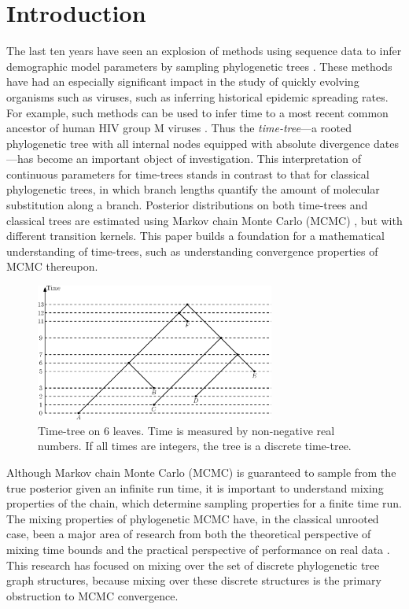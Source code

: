 \documentclass[11pt]{amsart}
\theoremstyle{definition}
\begin{document}
\section{Introduction}
The last ten years have seen an explosion of methods using sequence data to infer demographic model parameters by sampling phylogenetic trees \autocite{Kuhner1995-mj,Kuhner1998-tq,Kuhner2000-af,Beerli2001-sc,Kuhner2006-vx,Drummond2002,Drummond2005-ks,Drummond2006-oa,Minin2008-wz}.
These methods have had an especially significant impact in the study of quickly evolving organisms such as viruses, such as inferring historical epidemic spreading rates.
For example, such methods can be used to infer time to a most recent common ancestor of human HIV group M viruses \autocite{Worobey2008-rt,Baele2013-op}.
Thus the \emph{time-tree}---a rooted phylogenetic tree with all internal nodes equipped with absolute divergence dates---has become an important object of investigation.
This interpretation of continuous parameters for time-trees stands in contrast to that for classical phylogenetic trees, in which branch lengths quantify the amount of molecular substitution along a branch.
Posterior distributions on both time-trees and classical trees are estimated using Markov chain Monte Carlo (MCMC) \autocite{Mau1997-sq,Yang1997-gv,Drummond2002}, but with different transition kernels.
This paper builds a foundation for a mathematical understanding of time-trees, such as understanding convergence properties of MCMC thereupon.

\begin{figure}[ht]
\centering
\includegraphics[width=0.7\textwidth]{timeTree.eps}
\caption{Time-tree on $6$ leaves.
Time is measured by non-negative real numbers.
If all times are integers, the tree is a discrete time-tree.}
\label{timeTree.eps}
\end{figure}

Although Markov chain Monte Carlo (MCMC) is guaranteed to sample from the true posterior given an infinite run time, it is important to understand mixing properties of the chain, which determine sampling properties for a finite time run.
The mixing properties of phylogenetic MCMC have, in the classical unrooted case, been a major area of research from both the theoretical perspective of mixing time bounds \autocite{Mossel2005-ly,Mossel2006-fo,Stefankovic2011-hu,spade2014note} and the practical perspective of performance on real data \autocite{beiko2006searching,Ronquist2006-fv,lakner2008efficiency,Whidden2015-yi}.
This research has focused on mixing over the set of discrete phylogenetic tree graph structures, because mixing over these discrete structures is the primary obstruction to MCMC convergence.
\end{document}
